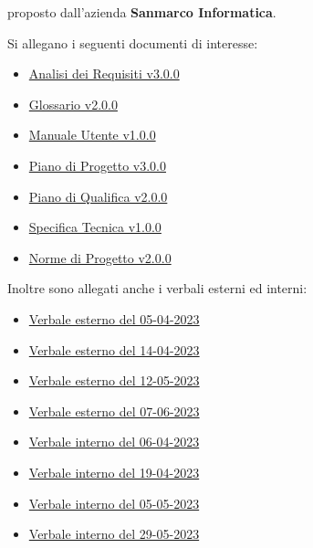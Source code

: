 \documentclass[10pt]{article}
\begin{document}
proposto dall’azienda \textbf{Sanmarco Informatica}.


Si allegano i seguenti documenti di interesse:
\begin{itemize}
  \item \href{https://github.com/7clickers/PB/blob/main/documentazione_esterna/analisi_dei_requisiti_v3.0.0.pdf}{Analisi dei Requisiti v3.0.0}
  \item \href{https://github.com/7clickers/PB/blob/main/documentazione_esterna/glossario_v2.0.0.pdf}{Glossario v2.0.0}
  \item \href{https://github.com/7clickers/PB/blob/main/documentazione_esterna/manuale_utente_1.0.0.pdf}{Manuale Utente v1.0.0}
  \item \href{https://github.com/7clickers/PB/blob/main/documentazione_esterna/piano_di_progetto_v3.0.0.pdf}{Piano di Progetto v3.0.0}
  \item \href{https://github.com/7clickers/PB/blob/main/documentazione_esterna/piano_di_qualifica_v2.0.0.pdf}{Piano di Qualifica v2.0.0}
  \item \href{https://github.com/7clickers/PB/blob/main/documentazione_esterna/specifica_tecnica_v1.0.0.pdf}{Specifica Tecnica v1.0.0}
  \item \href{https://github.com/7clickers/PB/blob/main/documentazione_interna/norme_di_progetto_v2.0.0.pdf}{Norme di Progetto v2.0.0}
\end{itemize}

Inoltre sono allegati anche i verbali esterni ed interni:

\begin{itemize}
  \item \href{https://github.com/7clickers/PB/blob/main/documentazione_esterna/verbali/VE_2023-04-05.pdf}{Verbale esterno del 05-04-2023}
  \item \href{https://github.com/7clickers/PB/blob/main/documentazione_esterna/verbali/VE_2023-04-14.pdf}{Verbale esterno del 14-04-2023}
  \item \href{https://github.com/7clickers/PB/blob/main/documentazione_esterna/verbali/VE_2023-05-12.pdf}{Verbale esterno del 12-05-2023}
  \item \href{https://github.com/7clickers/PB/blob/main/documentazione_esterna/verbali/VE_2023-06-07.pdf}{Verbale esterno del 07-06-2023}
  \item \href{https://github.com/7clickers/PB/blob/main/documentazione_interna/verbali/VI_2023-04-06.pdf}{Verbale interno del 06-04-2023}
  \item \href{https://github.com/7clickers/PB/blob/main/documentazione_interna/verbali/VI_2023-04-19.pdf}{Verbale interno del 19-04-2023}
  \item \href{https://github.com/7clickers/PB/blob/main/documentazione_interna/verbali/VI_2023-05-05.pdf}{Verbale interno del 05-05-2023}
  \item \href{https://github.com/7clickers/PB/blob/main/documentazione_interna/verbali/VI_2023-05-29.pdf}{Verbale interno del 29-05-2023}
\end{itemize}
\end{document}
